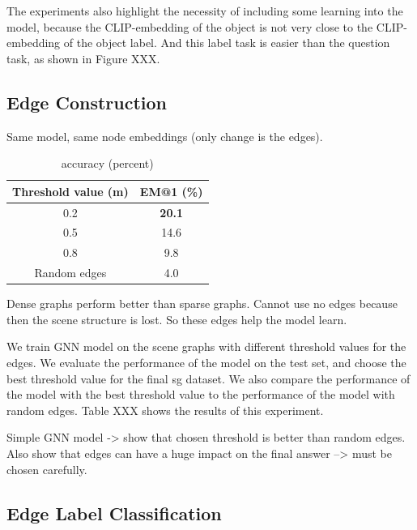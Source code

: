 The experiments also highlight the necessity of including some learning into the model, because the CLIP-embedding of the object is not very close to the CLIP-embedding of the object label. And this label task is easier than the question task, as shown in Figure XXX.


\subsection{Edge Construction}
Same model, same node embeddings (only change is the edges).

\begin{table}[h!]
    \centering
    \caption{accuracy (percent)}
    \begin{tabular}{|c|c|}
    \hline
    \multicolumn{1}{|l|}{\textbf{Threshold value (m)}} & \textbf{EM@1 (\%)} \\ \hline
    0.2                                                & \textbf{20.1}      \\ \hline
    0.5                                                & 14.6               \\ \hline
    0.8                                                & 9.8                \\ \hline
    Random edges                                       & 4.0                \\ \hline
    \end{tabular}
    \end{table}

Dense graphs perform better than sparse graphs. Cannot use no edges because then the scene structure is lost.
So these edges help the model learn.

We train GNN model on the scene graphs with different threshold values for the edges. We evaluate the performance of the model on the test set, and choose the best threshold value for the final sg dataset. We also compare the performance of the model with the best threshold value to the performance of the model with random edges. Table XXX shows the results of this experiment.

Simple GNN model -> show that chosen threshold is better than random edges.
Also show that edges can have a huge impact on the final answer --> must be chosen carefully.



\subsection{Edge Label Classification}


